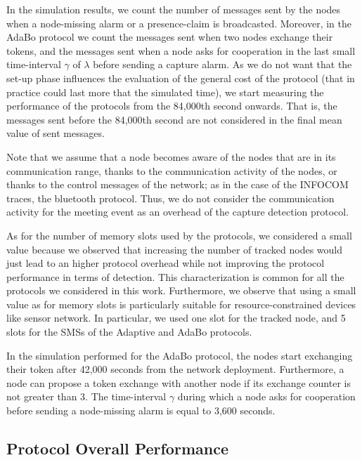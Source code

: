 \documentclass{IEEEconf}
\begin{document}
In the simulation results, we count the number of messages sent by the nodes when a node-missing alarm or a presence-claim is broadcasted. Moreover, in the AdaBo protocol we count the messages sent when two nodes exchange their tokens, and the messages sent when a node asks for cooperation in the last small time-interval $\gamma$ of $\lambda$ before sending a capture alarm.
As we do not want that the set-up phase influences the evaluation of the general cost of the protocol (that in practice could last more that the simulated time), we start measuring the performance of the protocols from the 84,000th second onwards. That is, the messages sent before the 84,000th second are not considered in the final mean value of sent messages.

Note that we assume that a node becomes aware of the nodes that are in its communication range, thanks to the communication activity of the nodes, or thanks to the control messages of the network; as in the case of the INFOCOM traces, the bluetooth protocol. Thus, we do not consider  the communication activity for the meeting event as an overhead of the capture detection protocol.

As for the number of memory slots used by the protocols, we considered a small value because we observed that increasing the number of tracked nodes would just lead to an higher protocol overhead while not improving the protocol performance in terms of detection. This characterization is common for all the protocols we considered in this work. Furthermore, we observe that using a small value as for memory slots is particularly suitable for resource-constrained devices like sensor network.
In particular, we used one slot for the tracked node, and 5 slots for the SMSs of the Adaptive and AdaBo protocols.


In the simulation performed for the AdaBo protocol, the nodes start exchanging their token after 42,000 seconds from the network deployment. Furthermore, a node can propose a token exchange with another node if its exchange counter is not greater than 3. The time-interval $\gamma$ during which a node asks for cooperation before sending a node-missing alarm is equal to 3,600 seconds.







\subsection{Protocol Overall Performance}
\label{OVperformances}
\end{document}
